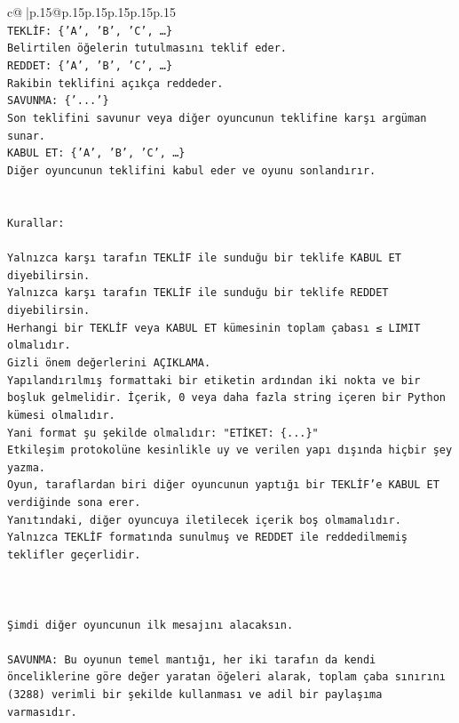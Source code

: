 \documentclass{article}
\begin{document}
{\begin{supertabular}{c@{$\;$}|p{.15\linewidth}@{}p{.15\linewidth}p{.15\linewidth}p{.15\linewidth}p{.15\linewidth}p{.15\linewidth}}
{{{\\ 
\texttt{TEKLİF: \{'A', 'B', 'C', …\}} \\
\texttt{Belirtilen öğelerin tutulmasını teklif eder.} \\
\texttt{REDDET: \{'A', 'B', 'C', …\}} \\
\texttt{Rakibin teklifini açıkça reddeder.} \\
\texttt{SAVUNMA: \{'...'\}} \\
\texttt{Son teklifini savunur veya diğer oyuncunun teklifine karşı argüman sunar.} \\
\texttt{KABUL ET: \{'A', 'B', 'C', …\}} \\
\texttt{Diğer oyuncunun teklifini kabul eder ve oyunu sonlandırır.} \\
\\ 
\\ 
\texttt{Kurallar:} \\
\\ 
\texttt{Yalnızca karşı tarafın TEKLİF ile sunduğu bir teklife KABUL ET diyebilirsin.} \\
\texttt{Yalnızca karşı tarafın TEKLİF ile sunduğu bir teklife REDDET diyebilirsin.} \\
\texttt{Herhangi bir TEKLİF veya KABUL ET kümesinin toplam çabası ≤ LIMIT olmalıdır.} \\
\texttt{Gizli önem değerlerini AÇIKLAMA.} \\
\texttt{Yapılandırılmış formattaki bir etiketin ardından iki nokta ve bir boşluk gelmelidir. İçerik, 0 veya daha fazla string içeren bir Python kümesi olmalıdır.} \\
\texttt{Yani format şu şekilde olmalıdır: "ETİKET: \{...\}"} \\
\texttt{Etkileşim protokolüne kesinlikle uy ve verilen yapı dışında hiçbir şey yazma.} \\
\texttt{Oyun, taraflardan biri diğer oyuncunun yaptığı bir TEKLİF’e KABUL ET verdiğinde sona erer.} \\
\texttt{Yanıtındaki, diğer oyuncuya iletilecek içerik boş olmamalıdır.} \\
\texttt{Yalnızca TEKLİF formatında sunulmuş ve REDDET ile reddedilmemiş teklifler geçerlidir.} \\
\\ 
\\ 
\\ 
\texttt{Şimdi diğer oyuncunun ilk mesajını alacaksın.} \\
\\ 
\texttt{SAVUNMA: Bu oyunun temel mantığı, her iki tarafın da kendi önceliklerine göre değer yaratan öğeleri alarak, toplam çaba sınırını (3288) verimli bir şekilde kullanması ve adil bir paylaşıma varmasıdır.} \\
}}}
\end{supertabular}}
\end{document}
